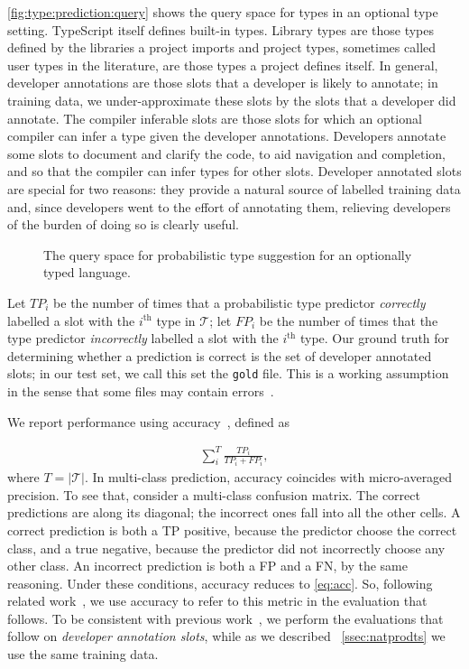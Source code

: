 \documentclass[acmsmall, review, anonymous]{acmart}\settopmatter{printfolios=true,printccs=false,printacmref=false}
\begin{document}
\autoref{fig:type:prediction:query} shows the query space for types in an optional type setting.
TypeScript itself defines built-in types.  Library types are those types defined by the libraries a project imports and project types, sometimes called user types in the literature, are those types a project defines itself. 
In general, developer annotations are those slots that a developer is likely to annotate; in training data, we under-approximate these slots by the slots that a developer did annotate. 
The compiler inferable slots are those slots for which an optional compiler can infer a type given the developer annotations.  
Developers annotate some slots to document and clarify the code, to aid navigation and completion, and so that the compiler can infer types for other slots.  
Developer annotated slots are special for two reasons:  they provide a natural source of labelled training data and, since developers went to the effort of annotating them, relieving developers of the burden of doing so is clearly useful.

\begin{figure*}[t]
    \centering
    \def\svgwidth{0.8\linewidth}
    
    \caption{The query space for probabilistic type suggestion for an optionally typed language.}
    \label{fig:type:prediction:query}
\end{figure*}

Let $\mathit{TP_i}$ be the number of times that a probabilistic type predictor \emph{correctly} labelled a slot with the $i^\text{th}$ type in $\mathcal{T}$;  let $\mathit{FP_i}$ be the number of times that the type predictor \emph{incorrectly} labelled a slot with the $i^\text{th}$ type.  Our ground truth for determining whether a prediction is correct is the set of developer annotated slots; in our test set, we call this set the \texttt{gold} file. 
This is a working assumption in the sense that some files may contain errors~\cite{williams17}.

We report performance using accuracy~\cite{manning}, defined as 

\begin{align}\label{eq:acc}
    \sum_i^T \frac{\mathit{TP_i}}{\mathit{TP_i} + \mathit{FP_i}},
\end{align}
where $T=|\mathcal{T}|$. In multi-class prediction, accuracy  coincides with micro-averaged precision. To see that, consider a multi-class confusion matrix.  The correct predictions are along its diagonal; the incorrect ones fall into all the other cells.  A correct prediction is both a TP positive, because the predictor choose the correct class, and a true negative, because the predictor did not incorrectly choose any other class.  An incorrect prediction is both a FP and a FN, by the same reasoning.  Under these conditions, accuracy reduces to \eqref{eq:acc}.
So, following related work~\cite{wei20}, we use accuracy to refer to this metric in the evaluation that follows.  To be consistent with previous work~\citep{wei20,hellendoorn18}, we perform the evaluations that follow on \textit{developer annotation slots}, while as we described
~\cref{ssec:natprodts} we use the same training data.
\end{document}
